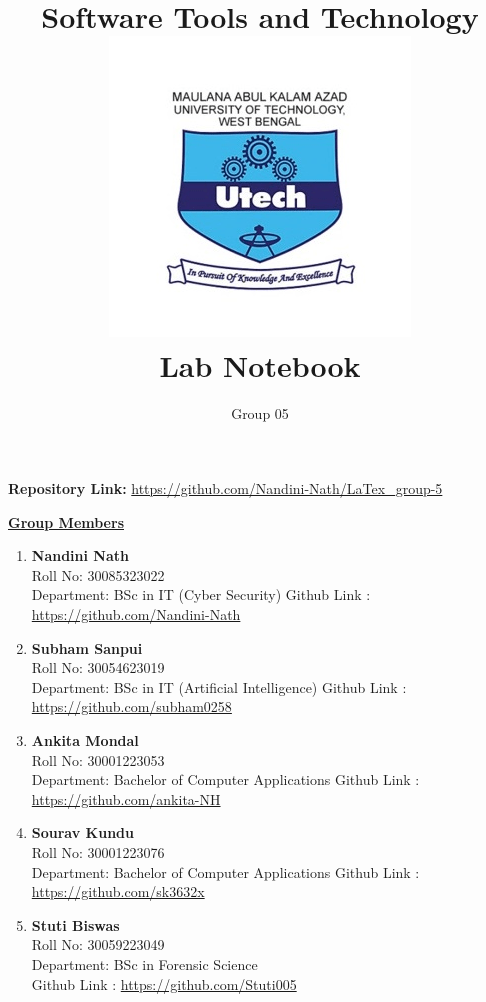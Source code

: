 \documentclass[12pt, a4paper]{article}
\title{
    \vspace{-2.5cm}
    \Huge \textbf{\color{black!60} Software Tools and Technology}\\[0.5cm]
    \includegraphics[width=0.3\linewidth]{Makaut.png}\\[0.2cm]
    \LARGE \textbf{\color{black} Lab Notebook}
}
\author{
    \vspace{1.3cm}
    \Large Group 05
}
\date{} %
\begin{document}
\maketitle
{}


\vspace{-2cm}
\begin{center}
\textbf{Repository Link:} \href{https://github.com/Nandini-Nath/LaTex_group-5}{\textcolor{blue!60}{https://github.com/Nandini-Nath/LaTex\_group-5}}
\end{center}

\vspace{0.5cm}

\centering
\bfseries{\underline{\Large \textcolor{blue!60}{Group Members}}}
\vspace{0.4cm}

\begin{flushleft}
\begin{enumerate}
    \item \textbf{Nandini Nath} \\
    Roll No: 30085323022 \\
    Department: BSc in IT (Cyber Security)
    Github Link : \url{https://github.com/Nandini-Nath}
    \item \textbf{Subham Sanpui} \\
    Roll No: 30054623019 \\
    Department: BSc in IT (Artificial Intelligence)
     Github Link : \url{https://github.com/subham0258}
    \item \textbf{Ankita Mondal} \\
    Roll No: 30001223053 \\
    Department: Bachelor of Computer Applications
     Github Link : \url{https://github.com/ankita-NH}
    \item \textbf{Sourav Kundu} \\
    Roll No: 30001223076 \\
    Department: Bachelor of Computer Applications
     Github Link : \url{https://github.com/sk3632x}
    \item \textbf{Stuti Biswas} \\
    Roll No: 30059223049 \\
    Department: BSc in Forensic Science \\
     Github Link : \url {https://github.com/Stuti005}
\end{enumerate}
\end{flushleft}
\end{document}
